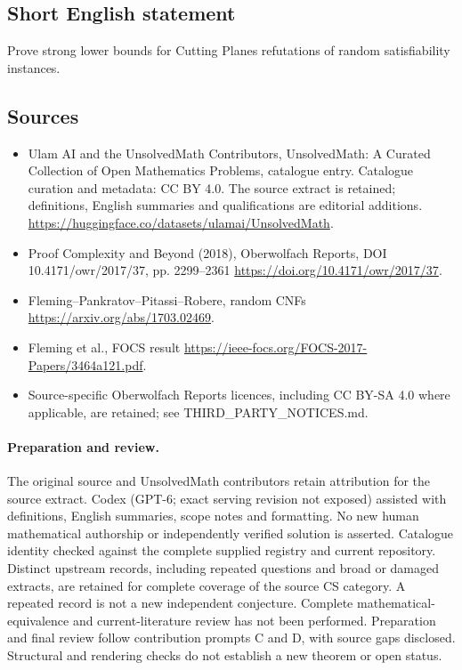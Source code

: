 \documentclass[11pt]{article}
\begin{document}
\subsection{Short English statement}
Prove strong lower bounds for Cutting Planes refutations of random satisfiability instances.
\subsection{Sources}
\begin{itemize}
\item[\hypertarget{source:statement:1}{S1}] Ulam AI and the UnsolvedMath Contributors, UnsolvedMath: A Curated Collection of Open Mathematics Problems, catalogue entry. Catalogue curation and metadata: CC BY 4.0. The source extract is retained; definitions, English summaries and qualifications are editorial additions.
\url{https://huggingface.co/datasets/ulamai/UnsolvedMath}.
\item[\hypertarget{source:statement:2}{S2}] Proof Complexity and Beyond (2018), Oberwolfach Reports, DOI 10.4171/owr/2017/37, pp. 2299--2361
\url{https://doi.org/10.4171/owr/2017/37}.
\item[\hypertarget{source:statement:3}{S3}] Fleming--Pankratov--Pitassi--Robere, random CNFs
\url{https://arxiv.org/abs/1703.02469}.
\item[\hypertarget{source:statement:4}{S4}] Fleming et al., FOCS result
\url{https://ieee-focs.org/FOCS-2017-Papers/3464a121.pdf}.
\item Source-specific Oberwolfach Reports licences, including CC BY-SA 4.0 where applicable, are retained; see THIRD\_PARTY\_NOTICES.md.
\end{itemize}
\paragraph{Preparation and review.}
The original source and UnsolvedMath contributors retain attribution for the source extract. Codex (GPT-6; exact serving revision not exposed) assisted with definitions, English summaries, scope notes and formatting. No new human mathematical authorship or independently verified solution is asserted. Catalogue identity checked against the complete supplied registry and current repository. Distinct upstream records, including repeated questions and broad or damaged extracts, are retained for complete coverage of the source CS category. A repeated record is not a new independent conjecture. Complete mathematical-equivalence and current-literature review has not been performed. Preparation and final review follow contribution prompts C and D, with source gaps disclosed. Structural and rendering checks do not establish a new theorem or open status.
\label{end:statement}
\end{document}
